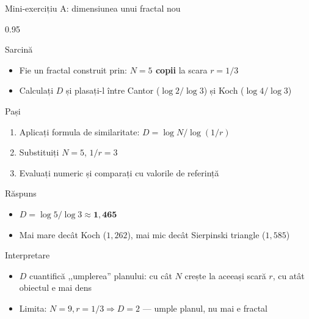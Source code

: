 \documentclass[9pt, aspectratio=169, t]{beamer}
\begin{document}
\begin{frame}[shrink=25]{Mini-exercițiu A: dimensiunea unui fractal nou}
\begin{cminipage}{0.95\textwidth}
\begin{block}{Sarcină}
\begin{itemize}\setlength{\itemsep}{0pt}
    \item Fie un fractal construit prin: \textbf{$N=5$ copii} la scara \textbf{$r=1/3$}
    \item Calculați $D$ și plasați-l între Cantor ($\log 2/\log 3$) și Koch ($\log 4/\log 3$)
\end{itemize}
\end{block}
\begin{block}{Pași}
\begin{enumerate}\setlength{\itemsep}{0pt}
    \item Aplicați formula de similaritate: $D=\log N/\log(1/r)$
    \item Substituiți $N=5$, $1/r=3$
    \item Evaluați numeric și comparați cu valorile de referință
\end{enumerate}
\end{block}
\begin{exampleblock}{Răspuns}
\begin{itemize}\setlength{\itemsep}{0pt}
    \item $D=\log 5/\log 3\approx \mathbf{1{,}465}$
    \item Mai mare decât Koch ($1{,}262$), mai mic decât Sierpinski triangle ($1{,}585$)
\end{itemize}
\end{exampleblock}
\begin{alertblock}{Interpretare}
\begin{itemize}\setlength{\itemsep}{0pt}
    \item $D$ cuantifică ,,umplerea'' planului: cu cât $N$ crește la aceeași scară $r$, cu atât obiectul e mai dens
    \item Limita: $N=9, r=1/3 \Rightarrow D=2$ --- umple planul, nu mai e fractal
\end{itemize}
\end{alertblock}
\end{cminipage}
\end{frame}
\end{document}
